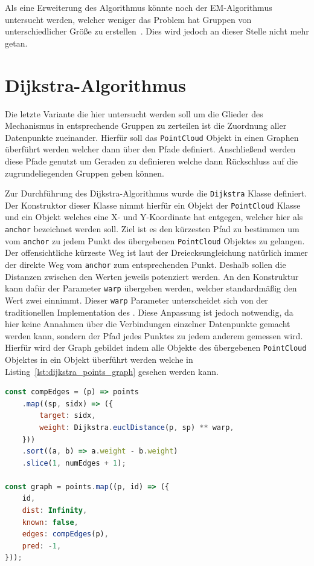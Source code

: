Als eine Erweiterung des  Algorithmus könnte noch der EM-Algorithmus untersucht werden, welcher weniger das Problem hat Gruppen von unterschiedlicher Grö{\ss}e zu erstellen~\cite[S.~262]{Geron2019}.
Dies wird jedoch an dieser Stelle nicht mehr getan.

\section{Dijkstra-Algorithmus}

Die letzte Variante die hier untersucht werden soll um die Glieder des Mechanismus in entsprechende Gruppen zu zerteilen ist die Zuordnung aller Datenpunkte zueinander.
Hierfür soll das \lstinline{PointCloud} Objekt in einen Graphen überführt werden welcher dann über den  Pfade definiert.
Anschlie{\ss}end werden diese Pfade genutzt um Geraden zu definieren welche dann Rückschluss auf die zugrundeliegenden Gruppen geben können.

Zur Durchführung des Dijkstra-Algorithmus wurde die \lstinline{Dijkstra} Klasse definiert.
Der Konstruktor dieser Klasse nimmt hierfür ein Objekt der \lstinline{PointCloud} Klasse und ein Objekt welches eine X- und Y-Koordinate hat entgegen, welcher hier als \lstinline{anchor} bezeichnet werden soll.
Ziel ist es den kürzesten Pfad zu bestimmen um vom \lstinline{anchor} zu jedem Punkt des übergebenen \lstinline{PointCloud} Objektes zu gelangen.
Der offensichtliche kürzeste Weg ist laut der Dreiecksungleichung natürlich immer der direkte Weg vom \lstinline{anchor} zum entsprechenden Punkt.
Deshalb sollen die Distanzen zwischen den Werten jeweils potenziert werden.
An den Konstruktur kann dafür der Parameter \lstinline{warp} übergeben werden, welcher standardmä{\ss}ig den Wert zwei einnimmt.
Dieser \lstinline{warp} Parameter unterscheidet sich von der traditionellen Implementation des .
Diese Anpassung ist jedoch notwendig, da hier keine Annahmen über die Verbindungen einzelner Datenpunkte gemacht werden kann, sondern der Pfad jedes Punktes zu jedem anderem gemessen wird.
Hierfür wird der Graph gebildet indem alle Objekte des übergebenen \lstinline{PointCloud} Objektes in ein Objekt überführt werden welche in Listing~\ref{lst:dijkstra_points_graph} gesehen werden kann.

\begin{lstlisting}[language=JavaScript, caption={Im \lstinline{Dijkstra} Konstruktor werden die Punkte des übergebenen \lstinline{PointCloud} Objektes in einen Graphen überführt.}, label={lst:dijkstra_points_graph}]
const compEdges = (p) => points
    .map((sp, sidx) => ({
        target: sidx,
        weight: Dijkstra.euclDistance(p, sp) ** warp,
    }))
    .sort((a, b) => a.weight - b.weight)
    .slice(1, numEdges + 1);

const graph = points.map((p, id) => ({
    id,
    dist: Infinity,
    known: false,
    edges: compEdges(p),
    pred: -1,
}));
\end{lstlisting}

